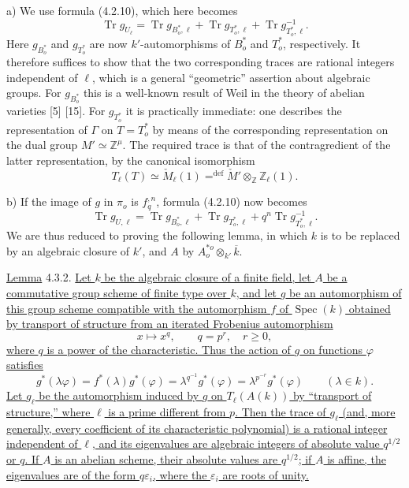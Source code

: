 \smallskip
\noindent
a) We use formula (4.2.10), which here becomes
\begin{equation}\tag{4.3.0}
 \operatorname{Tr}g_{U_\ell}
 =\operatorname{Tr}g_{B^*_o,\ell}
 +\operatorname{Tr}g_{T^*_o,\ell}
 +\operatorname{Tr}g^{-1}_{T^*_o,\ell}.
\end{equation}
Here $g_{B^*_o}$ and $g_{T^*_o}$ are now $k'$-automorphisms of $B^*_o$
and $T^*_o$, respectively.  It therefore suffices to show that the two
corresponding traces are rational integers independent of $\ell$, which
is a general ``geometric'' assertion about algebraic groups.  For
$g_{B^*_o}$ this is a well-known result of Weil in the theory of abelian
varieties [5] [15].  For $g_{T^*_o}$ it is practically immediate: one
describes the representation of $\Gamma$ on $T=T^*_o$ by means of the
corresponding representation on the dual group $M'\simeq\mathbb Z^\mu$.
The required trace is that of the contragredient of the latter
representation, by the canonical isomorphism
\[
 T_\ell(T)\simeq\check M_\ell(1)
 \mathrel{\mathop{=}^{\mathrm{def}}}
 \check M'\otimes_{\mathbb Z}\mathbb Z_\ell(1).
\]

\smallskip
\noindent
b) If the image of $g$ in $\pi_o$ is $f_q^{,n}$, formula (4.2.10) now
becomes
\begin{equation}\tag{4.3.1}
 \operatorname{Tr}g_{U,\ell}
 =\operatorname{Tr}g_{B^*_o,\ell}
 +\operatorname{Tr}g_{T^*_o,\ell}
 +q^n\operatorname{Tr}g^{-1}_{T^*_o,\ell}.
\end{equation}
We are thus reduced to proving the following lemma, in which $k$ is to be
replaced by an algebraic closure of $k'$, and $A$ by
$A^{*o}_o\otimes_{k'}\overline k$.

\medskip
\noindent
\underline{Lemma} 4.3.2. \underline{Let $k$ be the algebraic closure of
a finite field, let $A$ be a commutative group scheme of finite type over
$k$, and let $g$ be an automorphism of this group scheme compatible with
the automorphism $f$ of $\operatorname{Spec}(k)$ obtained by transport of
structure from an iterated Frobenius automorphism}
\[
 x\longmapsto x^q,
 \qquad q=p^r,\quad r\geq0,
\]
\underline{where $q$ is a power of the characteristic.  Thus the action
of $g$ on functions $\varphi$ satisfies}
\[
 g^*(\lambda\varphi)=f^*(\lambda)g^*(\varphi)
 =\lambda^{q^{-1}}g^*(\varphi)
 =\lambda^{p^{-r}}g^*(\varphi)
 \qquad(\lambda\in k).
\]
\underline{Let $g_\ell$ be the automorphism induced by $g$ on
$T_\ell(A(k))$ by ``transport of structure,'' where $\ell$ is a prime
different from $p$.  Then the trace of $g_\ell$ (and, more generally,
every coefficient of its characteristic polynomial) is a rational
integer independent of $\ell$, and its eigenvalues are algebraic integers
of absolute value $q^{1/2}$ or $q$.  If $A$ is an abelian scheme, their
absolute values are $q^{1/2}$; if $A$ is affine, the eigenvalues are of
the form $q\varepsilon_i$, where the $\varepsilon_i$ are roots of unity.}


